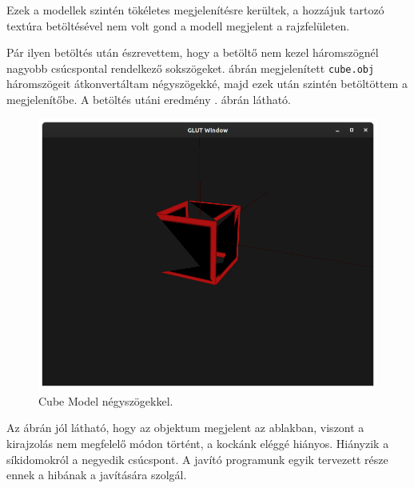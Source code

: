 Ezek a modellek szintén tökéletes megjelenítésre kerültek, a hozzájuk tartozó textúra betöltésével nem volt gond a modell megjelent a rajzfelületen.

Pár ilyen betöltés után észrevettem, hogy a betöltő nem kezel háromszögnél nagyobb csúcspontal rendelkező sokszögeket.  ábrán megjelenített \texttt{cube.obj} háromszögeit átkonvertáltam négyszögekké, majd ezek után szintén betöltöttem a megjelenítőbe. A betöltés utáni eredmény . ábrán látható.

\begin{figure}[h]
\centering
\includegraphics[width=\textwidth]{images/Model_quads.png}
\caption{Cube Model négyszögekkel.}
\label{fig:model2}
\end{figure}

Az ábrán jól látható, hogy az objektum megjelent az ablakban, viszont a kirajzolás nem megfelelő módon történt, a kockánk eléggé hiányos. Hiányzik a síkidomokról a negyedik csúcspont. A javító programunk egyik tervezett része ennek a hibának a javítására szolgál.
